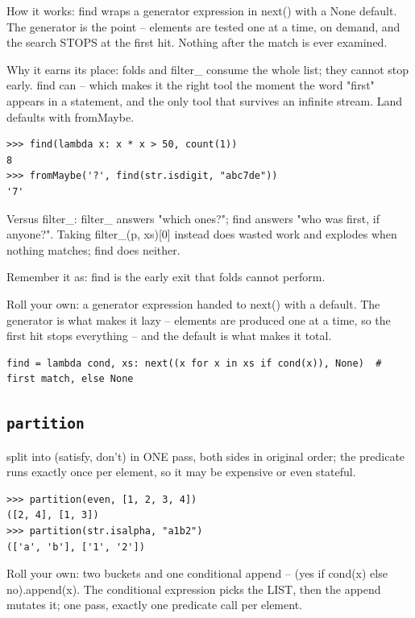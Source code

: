 \documentclass[10pt,letterpaper]{book}
\begin{document}
How it works: find wraps a generator expression in next() with a None default. The generator is the point -- elements are tested one at a time, on demand, and the search STOPS at the first hit. Nothing after the match is ever examined.


Why it earns its place: folds and filter\_ consume the whole list; they cannot stop early. find can -- which makes it the right tool the moment the word "first" appears in a statement, and the only tool that survives an infinite stream. Land defaults with fromMaybe.

\begin{lstlisting}[style=ex]
>>> find(lambda x: x * x > 50, count(1))
8
>>> fromMaybe('?', find(str.isdigit, "abc7de"))
'7'
\end{lstlisting}

Versus filter\_: filter\_ answers "which ones?"; find answers "who was first, if anyone?". Taking filter\_(p, xs)[0] instead does wasted work and explodes when nothing matches; find does neither.


Remember it as: find is the early exit that folds cannot perform.


Roll your own: a generator expression handed to next() with a default. The generator is what makes it lazy -- elements are produced one at a time, so the first hit stops everything -- and the default is what makes it total.

\begin{lstlisting}[style=ex]
find = lambda cond, xs: next((x for x in xs if cond(x)), None)  # first match, else None
\end{lstlisting}

\subsection{\texttt{partition}}\label{def:partition}
split into (satisfy, don't) in ONE pass, both sides in original order; the predicate runs exactly once per element, so it may be expensive or even stateful.
\begin{lstlisting}[style=ex]
>>> partition(even, [1, 2, 3, 4])
([2, 4], [1, 3])
>>> partition(str.isalpha, "a1b2")
(['a', 'b'], ['1', '2'])
\end{lstlisting}

Roll your own: two buckets and one conditional append -- (yes if cond(x) else no).append(x). The conditional expression picks the LIST, then the append mutates it; one pass, exactly one predicate call per element.
\end{document}
